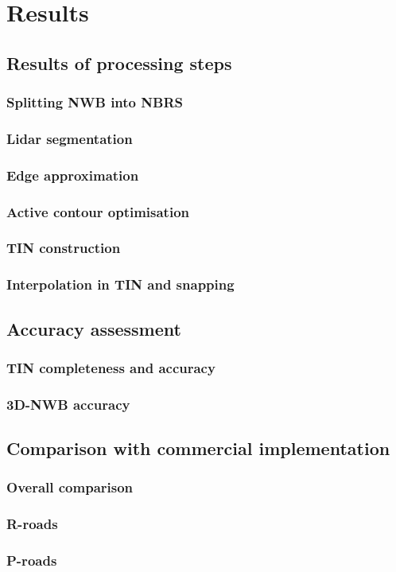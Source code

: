 \chapter{Results}
\label{chap:r}

\section{Results of processing steps}
\label{sec:resultsprocessing}

\subsection{Splitting NWB into NBRS}
\subsection{Lidar segmentation}
\subsection{Edge approximation}
\subsection{Active contour optimisation}
\subsection{TIN construction}
\subsection{Interpolation in TIN and snapping}

\section{Accuracy assessment}
\label{sec:accuracy}

\subsection{TIN completeness and accuracy}
\subsection{3D-NWB accuracy}

\section{Comparison with commercial implementation}
\label{sec:comparison}

\subsection{Overall comparison}
\subsection{R-roads}
\subsection{P-roads}